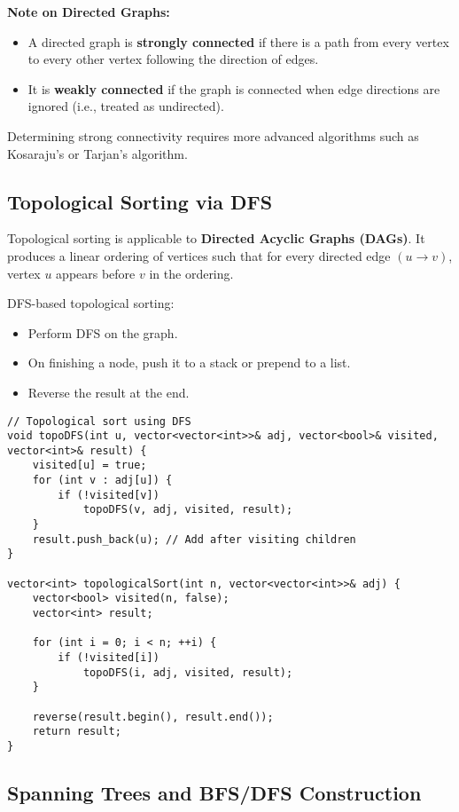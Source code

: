 \documentclass{article}
\begin{document}
\textbf{Note on Directed Graphs:}
\begin{itemize}
    \item A directed graph is \textbf{strongly connected} if there is a path from every vertex to every other vertex following the direction of edges.
    \item It is \textbf{weakly connected} if the graph is connected when edge directions are ignored (i.e., treated as undirected).
\end{itemize}

Determining strong connectivity requires more advanced algorithms such as Kosaraju’s or Tarjan’s algorithm.

\subsection{Topological Sorting via DFS}

Topological sorting is applicable to \textbf{Directed Acyclic Graphs (DAGs)}. It produces a linear ordering of vertices such that for every directed edge $(u \rightarrow v)$, vertex $u$ appears before $v$ in the ordering.

DFS-based topological sorting:
\begin{itemize}
    \item Perform DFS on the graph.
    \item On finishing a node, push it to a stack or prepend to a list.
    \item Reverse the result at the end.
\end{itemize}

\begin{lstlisting}[style=cppstyle]
// Topological sort using DFS
void topoDFS(int u, vector<vector<int>>& adj, vector<bool>& visited, vector<int>& result) {
    visited[u] = true;
    for (int v : adj[u]) {
        if (!visited[v])
            topoDFS(v, adj, visited, result);
    }
    result.push_back(u); // Add after visiting children
}

vector<int> topologicalSort(int n, vector<vector<int>>& adj) {
    vector<bool> visited(n, false);
    vector<int> result;

    for (int i = 0; i < n; ++i) {
        if (!visited[i])
            topoDFS(i, adj, visited, result);
    }

    reverse(result.begin(), result.end());
    return result;
}
\end{lstlisting}

\subsection{Spanning Trees and BFS/DFS Construction}
\end{document}
